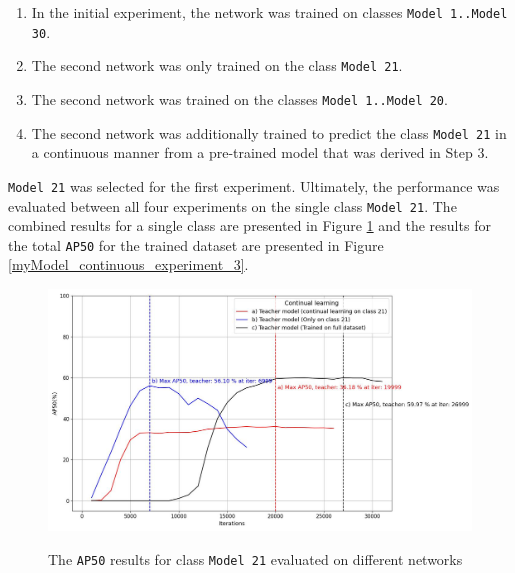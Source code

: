 \documentclass[english, 12pt, a4paper, elec, utf8, a-1b, online]{aaltothesis}
\begin{document}
\begin{enumerate}
\item In the initial experiment, the network was trained on classes \texttt{Model 1..Model 30}.
\item The second network was only trained on the class \texttt{Model 21}.
\item The second network was trained on the classes \texttt{Model 1..Model 20}.
\item The second network was additionally trained to predict the class \texttt{Model 21} in a continuous manner from a pre-trained model that was derived in Step 3.
\end{enumerate} 

\texttt{Model 21} was selected for the first experiment. Ultimately, the performance was evaluated between all four experiments on the single class \texttt{Model 21}. The combined results for a single class are presented in Figure  \ref{myModel_continuous_experiment_1} and the results for the total \texttt{AP50} for the trained dataset are presented in Figure \ref{myModel_continuous_experiment_3}.

\begin{figure}[htb]
	\begin{center}
		\includegraphics[width=14cm]{./AP50_continual_21.jpg}
	\end{center}
	\caption{The \texttt{AP50} results for class \texttt{Model 21} evaluated on different networks}
	\begin{center}
		\label{myModel_continuous_experiment_1}
	\end{center}
\end{figure}
\FloatBarrier  
\end{document}
